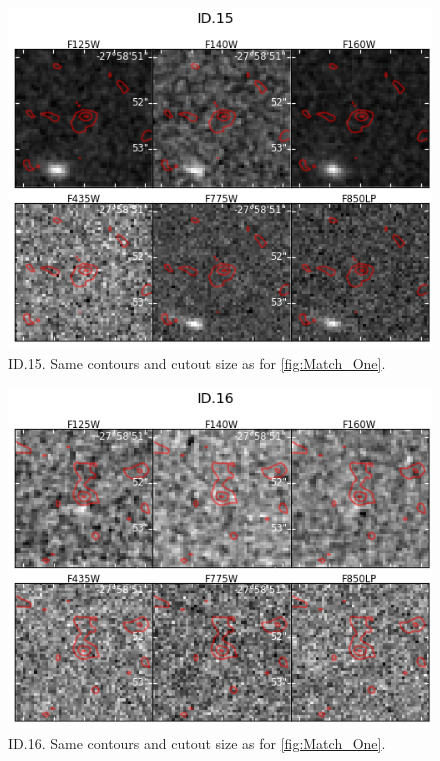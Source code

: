 \begin{figure}[tbp]
\centering \includegraphics[width=160mm]{Matched/ASPECS_Cutout_14.jpg}
\caption{ID.15. Same contours and cutout size as for \ref{fig:Match_One}.}
\label{fig:Match_Three}
\end{figure}

\begin{figure}[tbp]
\centering \includegraphics[width=160mm]{Matched/ASPECS_Cutout_15.jpg}
\caption{ID.16. Same contours and cutout size as for \ref{fig:Match_One}.}
\label{fig:Match_Three}
\end{figure}

